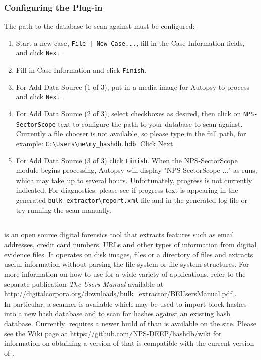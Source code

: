 \documentclass[11pt,fleqn]{article} %
\begin{document}
\subsubsection{Configuring the \sscope Plug-in}
The path to the \hdb database to scan against must be configured:

\begin{enumerate}
\item Start a new case, \verb+File | New Case...+, fill in the Case Information fields, and click \verb+Next+.
\item Fill in Case Information and click \verb+Finish+.
\item For Add Data Source (1 of 3), put in a media image for Autopsy to process and click \verb+Next+.
\item For Add Data Source (2 of 3), select checkboxes as desired, then click on \verb+NPS-SectorScope+ text to configure the path to your \hdb database to scan against. Currently a file chooser is not available, so please type in the full path, for example: \verb+C:\Users\me\my_hashdb.hdb+. Click Next.
\item For Add Data Source (3 of 3) click \verb+Finish+. When the NPS-SectorScope module begins processing, Autopsy will display "NPS-SectorScope ..." as \bulk runs, which may take up to several hours. Unfortunately, \bulk progress is not currently indicated. For diagnostics: please see if progress text is appearing in the generated \verb+bulk_extractor\report.xml+ file and in the generated log file or try running the scan manually.
\end{enumerate}

\subsection{\bulk}
\bulk is an open source digital forensics tool that extracts features such as email addresses, credit card numbers, URLs and other types of information from digital evidence files. It operates on disk images, files or a directory of files and extracts useful information without parsing the file system or file system structures.  For more information on how to use \bulk for a wide variety of applications, refer to the separate publication \textit{The \bulk Users Manual} available at \url{http://digitalcorpora.org/downloads/bulk_extractor/BEUsersManual.pdf} \cite{beusersguide}.\\

In particular, a \hdb \bulk scanner is available which may be used to import block hashes into a new hash database and to scan for hashes against an existing hash database.
Currently, \hdb requires a newer build of \bulk than is available on the \bulk site.
Please see the \hdb Wiki page at \url{https://github.com/NPS-DEEP/hashdb/wiki}
for information on obtaining a version of \bulk that is compatible with the current version of \hdb.\\
\end{document}
